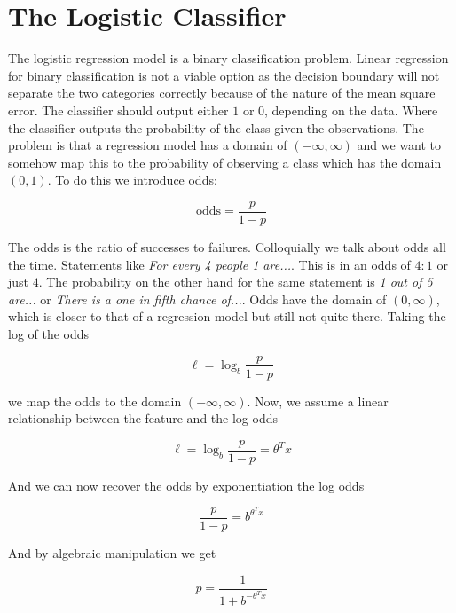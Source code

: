 \section{The Logistic Classifier}
The logistic regression model is a binary classification problem.
Linear regression for binary classification is not a viable option as the 
decision boundary will not separate the two categories correctly because of 
the nature of the mean square error.
The classifier should output either $1$ or $0$, depending on the data.
Where the classifier outputs the probability of the class given the 
observations. The problem is that a regression model has a domain of $(-\infty, \infty)$
and we want to somehow map this to the probability of observing a class which
has the domain $(0, 1)$. To do this we introduce odds:

\begin{equation*}
    \text{odds} = \frac{p}{1 - p}
\end{equation*}

The odds is the ratio of successes to failures. Colloquially we talk about odds
all the time. Statements like \textit{For every 4 people 1 are...}. This is in
an odds of $4:1$ or just $4$. The probability on the other hand for the same
statement is \textit{1 out of 5 are...} or 
\textit{There is a one in fifth chance of...}. 
Odds have the domain of $(0, \infty)$, which is closer to that of a regression
model but still not quite there. Taking the log of the odds 

\begin{equation*}
    \ell  = \log_{b} \frac{p}{1 - p}
\end{equation*}

we map the odds to the domain $(-\infty, \infty)$. Now, we assume a linear 
relationship between the feature and the log-odds

\begin{equation*}
    \ell  = \log_{b} \frac{p}{1 - p} = \theta^T x
\end{equation*}

And we can now recover the odds by exponentiation the log odds

\begin{equation*}
    \frac{p}{1 - p} = b^{\theta^T x}
\end{equation*}

And by algebraic manipulation we get

\begin{equation*}
    p = \frac{1}{1 + b^{-\theta^T x}}
\end{equation*}


